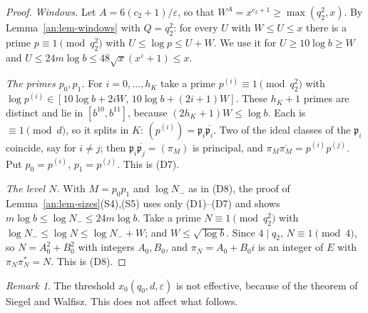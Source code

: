\documentclass[10pt]{amsart}
\theoremstyle{definition}
\theoremstyle{remark}
\newtheorem{remark}[theorem]{Remark}
\begin{document}
\begin{proof}
\emph{Windows.} Let $A=6(c_2+1)/\varepsilon$, so that $W^{A}=x^{c_2+1}\ge\max(q_2^{2},x)$.
By Lemma~\ref{an:lem-windows} with $Q=q_2^{2}$: for every $U$ with
$W\le U\le x$ there is a prime $p\equiv1\pmod{q_2^{2}}$ with
$U\le\log p\le U+W$. We use it for $U\ge10\log b\ge W$ and
$U\le24m\log b\le48\sqrt x(x^{\varepsilon}+1)\le x$.

\emph{The primes $p_0,p_1$.} For $i=0,\dots,h_K$ take a prime
$p^{(i)}\equiv1\pmod{q_2^{2}}$ with
$\log p^{(i)}\in[10\log b+2iW,\,10\log b+(2i+1)W]$. These $h_K+1$ primes are
distinct and lie in $[b^{10},b^{11}]$, because $(2h_K+1)W\le\log b$. Each is
$\equiv1\pmod d$, so it splits in $K$: $(p^{(i)})=\mathfrak p_i\overline{\mathfrak p_i}$.
Two of the ideal classes of the $\mathfrak p_i$ coincide, say for $i\ne j$;
then $\mathfrak p_i\overline{\mathfrak p_j}=(\pi_M)$ is principal, and
$\pi_M\overline{\pi_M}=p^{(i)}p^{(j)}$. Put $p_0=p^{(i)}$, $p_1=p^{(j)}$.
This is (D7).

\emph{The level $N$.} With $M=p_0p_1$ and $\log N_-$ as in (D8), the proof of
Lemma~\ref{an:lem-sizes}(S4),(S5) uses only (D1)--(D7) and shows
$m\log b\le\log N_-\le24m\log b$. Take a prime $N\equiv1\pmod{q_2^{2}}$ with
$\log N_-\le\log N\le\log N_-+W$; and $W\le\sqrt{\log b}$. Since $4\mid q_2$,
$N\equiv1\pmod4$, so $N=A_0^2+B_0^2$ with integers $A_0,B_0$, and
$\pi_N=A_0+B_0i$ is an integer of $E$ with $\pi_N\pi_N^{*}=N$. This is (D8).
\end{proof}
\begin{remark}\label{an:rem-ineff}
The threshold $x_0(q_0,d,\varepsilon)$ is not effective, because of the
theorem of Siegel and Walfisz. This does not affect what follows.
\end{remark}
\end{document}
